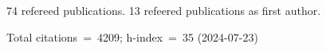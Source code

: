 74 refereed publications. 13 refeered publications as first author.

Total citations~=~4209; h-index~=~35 (2024-07-23)